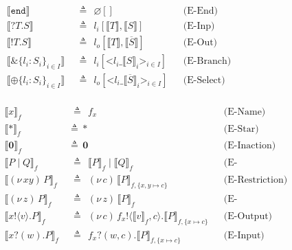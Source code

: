 \documentclass{l4proj}
\begin{document}
\begin{figure}[H]
\centering
\begin{subfigure}{\textwidth}
\begin{align*}
\llbracket \texttt{end} \rrbracket \:\: &\triangleq \:\: \varnothing[] & &\text{(E-End)}\\
\llbracket \texttt{?}T.S \rrbracket \:\: &\triangleq \:\: l_{i}[\llbracket T \rrbracket, \llbracket S \rrbracket] & &\text{(E-Inp)}\\
\llbracket \texttt{!}T.S \rrbracket \:\: &\triangleq \:\: l_{o}[\llbracket T \rrbracket, \llbracket \overline{S} \rrbracket] & &\text{(E-Out)}\\
\llbracket \&\{l_{i}:S_{i}\}_{i \in I} \rrbracket \:\: &\triangleq \:\: l_{i}[\texttt{<}l_{i}\_\llbracket S \rrbracket_{i}\texttt{>}_{i \in I}] & &\text{(E-Branch)}\\
\llbracket \oplus\{l_{i}:S_{i}\}_{i \in I} \rrbracket \:\: &\triangleq \:\: l_{o}[\texttt{<}l_{i}\_\llbracket \overline{S} \rrbracket_{i}\texttt{>}_{i \in I}] & &\text{(E-Select)} \\
\end{align*}
\end{subfigure}
\begin{subfigure}{\textwidth}
\begin{align*}
\llbracket x \rrbracket_{f} \:\: &\triangleq \:\: f_{x} & &\text{(E-Name)}\\
\llbracket \texttt{*} \rrbracket_{f} \:\: &\triangleq \:\: \texttt{*} & &\text{(E-Star)}\\
\llbracket \textbf{0} \rrbracket_{f} \:\: &\triangleq \:\: \textbf{0} & &\text{(E-Inaction)}\\
\llbracket P \mid Q \rrbracket_{f} \:\: &\triangleq \:\: \llbracket P \rrbracket_{f} \mid \llbracket Q \rrbracket_{f} & &\text{(E-Composition)}\\
\llbracket (\nu\,xy)\,P \rrbracket_{f} \:\: &\triangleq \:\: (\nu\,c)\,\llbracket P \rrbracket_{f,\{x,y \mapsto c\}} & &\text{(E-Restriction)}\\
\llbracket (\nu\,z)\,P \rrbracket_{f} \:\: &\triangleq \:\: (\nu\,z)\,\llbracket P \rrbracket_{f} & &\text{(E-StndRestriction)}\\
\llbracket x\texttt{!} \langle v \rangle .P \rrbracket_{f} \:\: &\triangleq \:\: (\nu\,c)\,f_{x}\texttt{!} \langle \llbracket v \rrbracket_{f}, c \rangle.\llbracket P \rrbracket_{f,\{x \mapsto c\}} & &\text{(E-Output)}\\
\llbracket x\texttt{?}(w).P \rrbracket_{f} \:\: &\triangleq \:\: f_{x}\texttt{?}(w, c).\llbracket P \rrbracket_{f,\{x \mapsto c\}} & &\text{(E-Input)}\\

\end{align*}
\end{subfigure}
\end{figure}
\end{document}
